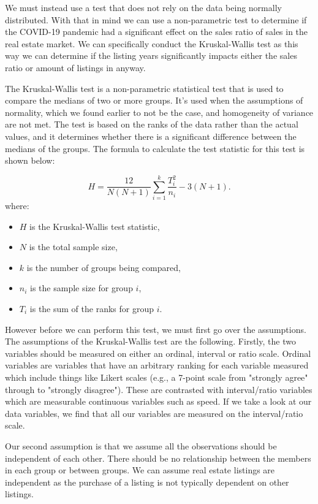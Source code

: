 \documentclass[12pt]{article}
\begin{document}
We must instead use a test that does not rely on the data being normally distributed. With that in mind we can use a non-parametric test to determine if the COVID-19 pandemic had a significant effect on the sales ratio of sales in the real estate market. We can specifically conduct the Kruskal-Wallis test as this way we can determine if the listing years significantly impacts either the sales ratio or amount of listings in anyway. 

The Kruskal-Wallis test is a non-parametric statistical test that is used to compare the medians of two or more groups. It's used when the assumptions of normality, which we found earlier to not be the case, and homogeneity of variance are not met. The test is based on the ranks of the data rather than the actual values, and it determines whether there is a significant difference between the medians of the groups. The formula to calculate the test statistic for this test is shown below:


\begin{equation}
H = \frac{12}{N(N+1)} \sum_{i=1}^{k} \frac{T_i^2}{n_i} - 3(N+1).
\label{eq:kruskalWallis} 
\end{equation}
where:
\begin{itemize}
\item $H$ is the Kruskal-Wallis test statistic,
\item $N$ is the total sample size,
\item $k$ is the number of groups being compared,
\item $n_i$ is the sample size for group $i$,
\item $T_i$ is the sum of the ranks for group $i$.
\end{itemize}

However before we can perform this test, we must first go over the assumptions. The assumptions of the Kruskal-Wallis test are the following. Firstly, the two variables should be measured on either an ordinal, interval or ratio scale. Ordinal variables are variables that have an arbitrary ranking for each variable measured which include things like Likert scales (e.g., a 7-point scale from "strongly agree" through to "strongly disagree"). These are contrasted with interval/ratio variables which are measurable continuous variables such as speed. If we take a look at our data variables, we find that all our variables are measured on the interval/ratio scale.

Our second assumption is that we assume all the observations should be independent of each other. There should be no relationship between the members in each group or between groups. We can assume real estate listings are independent as the purchase of a listing is not typically dependent on other listings. 
\end{document}

